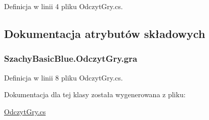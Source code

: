 Definicja w linii 4 pliku Odczyt\-Gry.\-cs.



\subsection{Dokumentacja atrybutów składowych}
\hypertarget{class_szachy_basic_blue_1_1_odczyt_gry_aa31f0e6621c5259169ccd0cb12ae74e1}{
\subsubsection[{gra}]{ Szachy\-Basic\-Blue.\-Odczyt\-Gry.\-gra\hspace{0.3cm}{\ttfamily [private]}}}\label{class_szachy_basic_blue_1_1_odczyt_gry_aa31f0e6621c5259169ccd0cb12ae74e1}


Definicja w linii 8 pliku Odczyt\-Gry.\-cs.



Dokumentacja dla tej klasy została wygenerowana z pliku\-:\begin{DoxyCompactItemize}
\item 
\hyperlink{_odczyt_gry_8cs}{Odczyt\-Gry.\-cs}\end{DoxyCompactItemize}
